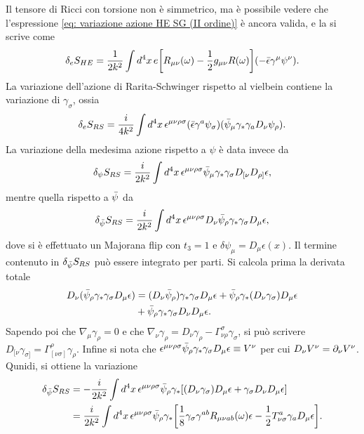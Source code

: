 Il tensore di Ricci con torsione non è simmetrico, ma è possibile vedere che l'espressione \eqref{eq: variazione azione HE SG (II ordine)} è ancora valida, e la si scrive come
\begin{equation}
    \delta_e S_{HE} = \frac{1}{2k^2}\int d^4x\, e\bigg[R_{\mu\nu}(\omega) - \frac{1}{2}g_{\mu\nu}R(\omega)\bigg](-\bar{\epsilon}\gamma^\mu\psi^\nu).
\end{equation}
La variazione dell'azione di Rarita-Schwinger rispetto al vielbein contiene la variazione di $\gamma_\sigma$, ossia 
\begin{equation}
    \delta_e S_{RS} = \frac{i}{4k^2}\int d^4x\,\epsilon^{\mu\nu\rho\sigma}(\bar{\epsilon}\gamma^a\psi_\sigma)(\bar{\psi}_\mu\gamma_*\gamma_a D_\nu\psi_\rho).
\end{equation}
La variazione della medesima azione rispetto a $\psi$ è data invece da
\begin{equation}
\label{eq: variazione azione RS per psi}
    \delta_\psi S_{RS} = \frac{i}{2k^2}\int d^4x\,\epsilon^{\mu\nu\rho\sigma}\bar{\psi}_\mu\gamma_*\gamma_\sigma D_{[\nu}D_{\rho]}\epsilon,
\end{equation}
mentre quella rispetto a $\bar{\psi}$ da
\begin{equation}
    \delta_{\bar{\psi}} S_{RS} = \frac{i}{2k^2}\int d^4x\,\epsilon^{\mu\nu\rho\sigma}D_\nu\bar{\psi}_\rho\gamma_*\gamma_\sigma D_\mu\epsilon,
\end{equation}
dove si è effettuato un Majorana flip con $t_3 = 1$ e $\delta \psi_\mu = D_\mu\epsilon(x)$. Il termine contenuto in $\delta_{\bar{\psi}} S_{RS}$ può essere integrato per parti. Si calcola prima la derivata totale
\begin{equation}
    \begin{split}
        D_\nu(\bar{\psi}_\rho\gamma_*\gamma_\sigma D_\mu\epsilon) &= (D_\nu\bar{\psi}_\rho)\gamma_*\gamma_\sigma D_\mu\epsilon + \bar{\psi}_\rho\gamma_*(D_\nu \gamma_\sigma)D_\mu\epsilon \\
        &+ \bar{\psi}_\rho\gamma_*\gamma_\sigma D_\nu D_\mu\epsilon.
    \end{split}
\end{equation}
Sapendo poi che $\nabla_\mu\gamma_\rho = 0$ e che $\nabla_\nu\gamma_\rho = D_\nu\gamma_\rho - \Gamma^\sigma_{\nu\rho}\gamma_\sigma$, si può scrivere $D_{[\nu}\gamma_{\sigma]} = \Gamma^\rho_{[\nu\sigma]}\gamma_\rho$. Infine si nota che $\epsilon^{\mu\nu\rho\sigma}\bar{\psi}_\rho\gamma_*\gamma_\sigma D_\mu\epsilon \equiv V^\nu$ per cui $D_\nu V^\nu = \partial_\nu V^\nu$. Qunidi, si ottiene la variazione 
\begin{equation}
\label{eq: variazione azione RS per psi barra}
    \begin{split}
        \delta_{\bar{\psi}}S_{RS} &= -\frac{i}{2k^2}\int d^4x\,\epsilon^{\mu\nu\rho\sigma}\bar{\psi}_\rho\gamma_*[(D_\nu\gamma_\sigma)D_\mu\epsilon + \gamma_\sigma  D_\nu D_\mu\epsilon] \\
        &= \frac{i}{2k^2}\int d^4x\,\epsilon^{\mu\nu\rho\sigma}\bar{\psi}_\rho\gamma_*\bigg[\frac{1}{8}\gamma_\sigma\gamma^{ab}R_{\mu\nu ab}(\omega)\epsilon - \frac{1}{2}T^a_{\nu\sigma}\gamma_a D_\mu\epsilon\bigg].
    \end{split}  
\end{equation}
